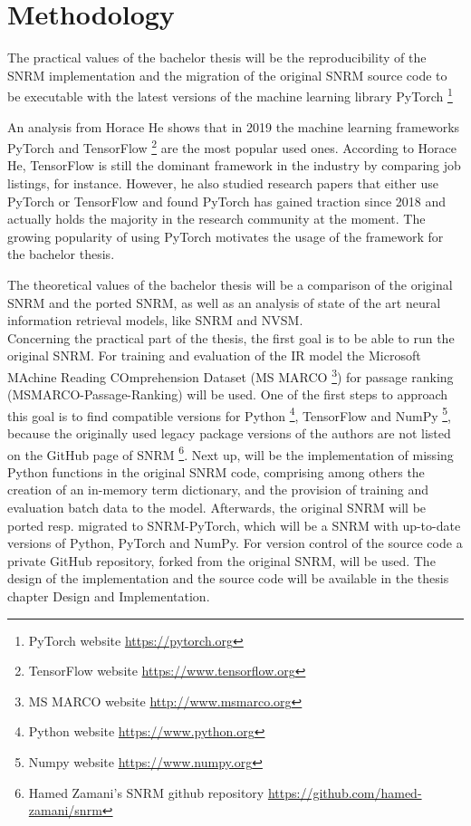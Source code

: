 \chapter{Methodology}

The practical values of the bachelor thesis will be the reproducibility of the SNRM implementation and the migration of the original SNRM source code to be executable with the latest versions of the machine learning library PyTorch \footnote{PyTorch website \url{https://pytorch.org}}  

An analysis \cite{he:2019:state-of-ml-frameworks} from Horace He shows that in 2019 the machine learning frameworks PyTorch and TensorFlow \footnote{TensorFlow website \url{https://www.tensorflow.org}} are the most popular used ones.
According to Horace He, TensorFlow is still the dominant framework in the industry by comparing job listings, for instance.
However, he also studied research papers that either use PyTorch or TensorFlow and found PyTorch has gained traction since 2018 and actually holds the majority in the research community at the moment. \cite{he:2019:state-of-ml-frameworks}
The growing popularity of using PyTorch motivates the usage of the framework for the bachelor thesis.

The theoretical values of the bachelor thesis will be a comparison of the original SNRM and the ported SNRM, as well as an analysis of state of the art neural information retrieval models, like SNRM and NVSM.
\\Concerning the practical part of the thesis, the first goal is to be able to run the original SNRM.
For training and evaluation of the IR model the Microsoft MAchine Reading COmprehension Dataset (MS MARCO \footnote{MS MARCO website \url{http://www.msmarco.org}}) for passage ranking (MSMARCO-Passage-Ranking) will be used.
One of the first steps to approach this goal is to find compatible versions for Python \footnote{Python website \url{https://www.python.org}}, TensorFlow and NumPy \footnote{Numpy website \url{https://www.numpy.org}}, because the originally used legacy package versions of the authors are not listed on the GitHub page of SNRM \footnote{Hamed Zamani's SNRM github repository \url{https://github.com/hamed-zamani/snrm}}.
Next up, will be the implementation of missing Python functions in the original SNRM code, comprising among others the creation of an in-memory term dictionary, and the provision of training and evaluation batch data to the model.
Afterwards, the original SNRM will be ported resp. migrated to SNRM-PyTorch, which will be a SNRM with up-to-date versions of Python, PyTorch and NumPy.
For version control of the source code a private GitHub repository, forked from the original SNRM, will be used.
The design of the implementation and the source code will be available in the thesis chapter Design and Implementation.

